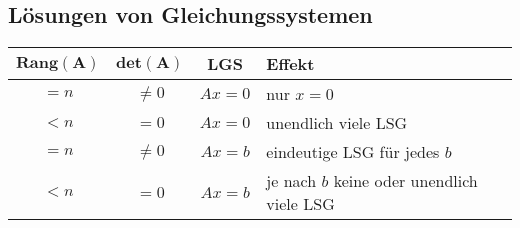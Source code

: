 \subsection{Lösungen von Gleichungssystemen}{
    \vskip1pt
    \begin{center}
    \begin{tabularx}{\linewidth}{| c | c | c | X |}
        \hline
        $\mathbf{Rang(A)}$ & $\mathbf{det(A)}$ & \textbf{LGS} & \textbf{Effekt}\\
        \hline \hline
        $= n$ & $\neq 0$ & $Ax = 0$ & nur $x = 0$\\
        \hline
        $< n$ & $= 0$ & $Ax = 0$ & unendlich viele LSG\\
        \hline
        $= n$ & $\neq 0$ & $Ax = b$ & eindeutige LSG für jedes $b$\\
        \hline
        $< n$ & $= 0$ & $Ax = b$ & je nach $b$ keine oder unendlich viele LSG\\
        \hline
    \end{tabularx}
    \end{center}
}
